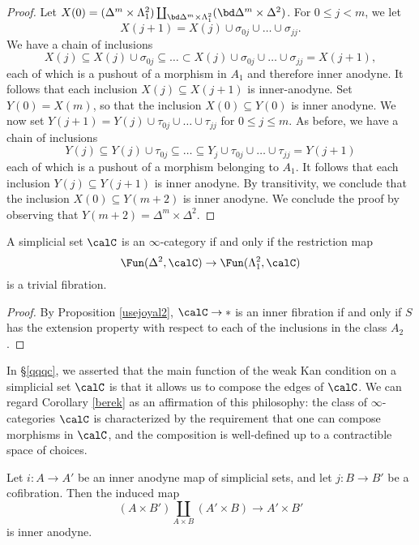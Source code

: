 \begin{proof}
Let $X(0) = (\Delta^m \times
\Lambda^2_1) \coprod_{ \bd \Delta^m \times \Lambda^2_1 } (\bd
\Delta^m \times \Delta^2)$. For $0 \leq j < m$, we let
$$ X(j+1) = X(j) \cup \sigma_{0j} \cup \ldots \cup \sigma_{jj}. $$
We have a chain of inclusions
$$ X(j) \subseteq X(j) \cup \sigma_{0j} \subseteq \ldots \subset X(j) \cup \sigma_{0j} \cup
\ldots \cup \sigma_{jj} = X(j+1),$$
each of which is a pushout of a morphism in $A_1$ and therefore inner anodyne. It follows
that each inclusion $X(j) \subseteq X(j+1)$ is inner-anodyne. Set $Y(0) = X(m)$, so that the inclusion $X(0) \subseteq Y(0)$ is inner anodyne. We now set $Y(j+1) = Y(j) \cup \tau_{0j} \cup \ldots \cup \tau_{jj}$
for $0 \leq j \leq m$. As before, we have a chain of inclusions
$$ Y(j) \subseteq Y(j) \cup \tau_{0j} \subseteq \ldots \subseteq Y_{j} \cup \tau_{0j} \cup 
\ldots \cup \tau_{jj} = Y(j+1)$$
each of which is a pushout of a morphism belonging to $A_1$. It follows that
each inclusion $Y(j) \subseteq Y(j+1)$ is inner anodyne. By transitivity, we conclude
that the inclusion $X(0) \subseteq Y(m+2)$ is inner anodyne. We conclude the proof by observing that $Y(m+2) = \Delta^m \times \Delta^2$.
\end{proof}

\begin{corollary}\label{berek}
A simplicial set $\calC$ is an $\infty$-category if and only if the restriction map $$
\Fun(\Delta^2,\calC) \rightarrow \Fun(\Lambda^2_1, \calC)$$ is a trivial fibration.
\end{corollary}

\begin{proof}
By Proposition \ref{usejoyal2}, $\calC \rightarrow \ast$ is an inner fibration if and only if $S$ has the extension property with respect to each of the inclusions in the class $A_2$.
\end{proof}

\begin{remark}
In \S \ref{qqqc}, we asserted that the main function of the weak Kan condition on a simplicial set $\calC$ is that it allows us to compose the edges of $\calC$. We can regard Corollary \ref{berek} as an affirmation of this philosophy: the class of $\infty$-categories $\calC$ is characterized by the requirement that one can compose morphisms in $\calC$, and the composition is well-defined up to a contractible space of choices.
\end{remark}

\begin{corollary}\label{prodprod2}
Let $i: A \rightarrow A'$ be an inner anodyne map of simplicial sets, and let $j: B \rightarrow B'$ be a cofibration. Then
the induced map $$(A \times B') \coprod_{A \times B} (A' \times B)
\rightarrow A' \times B'$$ is inner anodyne.
\end{corollary}

